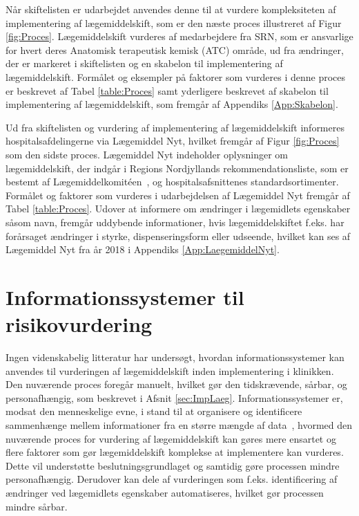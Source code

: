 Når skiftelisten er udarbejdet anvendes denne til at vurdere kompleksiteten af implementering af lægemiddelskift, som er den næste proces illustreret af Figur \ref{fig:Proces}. Lægemiddelskift vurderes af medarbejdere fra SRN, som er ansvarlige for hvert deres Anatomisk terapeutisk kemisk (ATC) område, ud fra ændringer, der er markeret i skiftelisten og en skabelon til implementering af lægemiddelskift. Formålet og eksempler på faktorer som vurderes i denne proces er beskrevet af Tabel \ref{table:Proces} samt yderligere beskrevet af skabelon til implementering af lægemiddelskift, som fremgår af Appendiks \ref{App:Skabelon}.

Ud fra skiftelisten og vurdering af implementering af lægemiddelskift informeres hospitalsafdelingerne via Lægemiddel Nyt, hvilket fremgår af Figur \ref{fig:Proces} som den sidste proces. Lægemiddel Nyt indeholder oplysninger om lægemiddelskift, der indgår i Regions Nordjyllands rekommendationsliste, som er bestemt af Lægemiddelkomitéen~\citep{RegionNordjylland2018}, og hospitalsafsnittenes standardsortimenter. Formålet og faktorer som vurderes i udarbejdelsen af Lægemiddel Nyt fremgår af Tabel \ref{table:Proces}. Udover at informere om ændringer i lægemidlets egenskaber såsom navn, fremgår uddybende informationer, hvis lægemiddelskiftet f.eks. har forårsaget ændringer i styrke, dispenseringsform eller udseende, hvilket kan ses af Lægemiddel Nyt fra år 2018 i Appendiks \ref{App:LaegemiddelNyt}.  

\section{Informationssystemer til risikovurdering} \label{sec:Inform_Risk}
Ingen videnskabelig litteratur har undersøgt, hvordan informationssystemer kan anvendes til vurderingen af lægemiddelskift inden implementering i klinikken. Den nuværende proces foregår manuelt, hvilket gør den tidskrævende, sårbar, og personafhængig, som beskrevet i Afsnit \ref{sec:ImpLaeg}. Informationssystemer er, modsat den menneskelige evne, i stand til at organisere og identificere sammenhænge mellem informationer fra en større mængde af data~\citep{Agrawal2009}, hvormed den nuværende proces for vurdering af lægemiddelskift kan gøres mere ensartet og flere faktorer som gør lægemiddelskift komplekse at implementere kan vurderes. Dette vil understøtte beslutningsgrundlaget og samtidig gøre processen mindre personafhængig. Derudover kan dele af vurderingen som f.eks. identificering af ændringer ved lægemidlets egenskaber automatiseres, hvilket gør processen mindre sårbar. 

